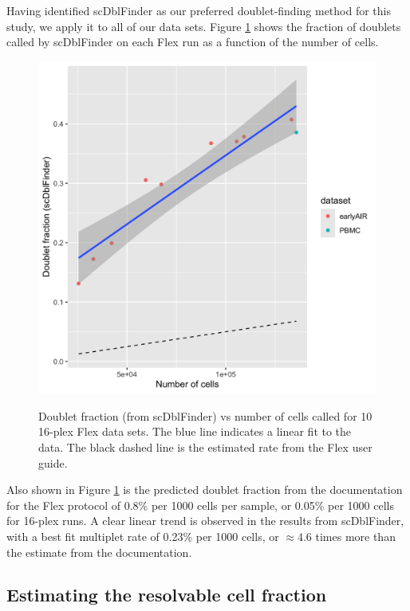 \documentclass[unnumsec,webpdf,modern,large]{oup-authoring-template}
\begin{document}
	Having identified scDblFinder 
	\citep{Germain2021}
	as our preferred doublet-finding method for this study, we apply it to all of our data sets. 
	Figure \ref{fig:doublet rate 16-plex} shows the fraction of doublets called by scDblFinder on each Flex run as a function of the number of cells.
	\begin{figure}
		\begin{center}
			\includegraphics[scale=0.13]{figures/doublet_rate_16plex.png}	\\
			\caption{Doublet fraction (from scDblFinder) vs number of cells called for 10 16-plex Flex data sets. 
				The blue line indicates a linear fit to the data. 
				The black dashed line is the estimated rate from the Flex user guide. 
			}		
			\label{fig:doublet rate 16-plex}
		\end{center}
	\end{figure}
	Also shown in Figure  \ref{fig:doublet rate 16-plex} is the predicted doublet fraction from the documentation for the Flex protocol 
	\citep{10X_flex_protocol}
	of 0.8\% per 1000 cells per sample, or 0.05\% per 1000 cells for 16-plex runs. 
	A clear linear trend is observed in the results from scDblFinder, with a best fit multiplet rate of 0.23\% per 1000 cells, or $\approx 4.6$ times more than the estimate from the documentation.
		
	\subsection{Estimating the resolvable cell fraction}
	\label{subsec:multiplet theory}
	
\end{document}
